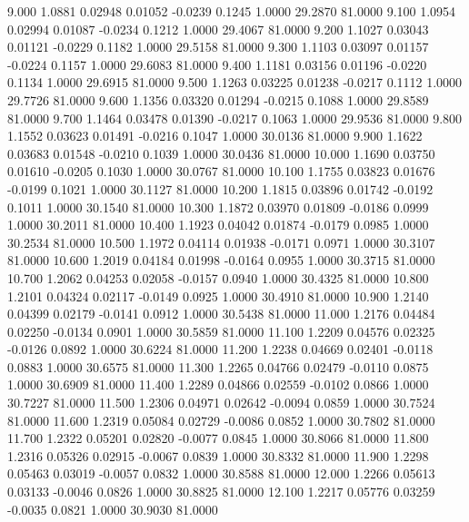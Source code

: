    9.000   1.0881   0.02948   0.01052  -0.0239   0.1245   1.0000  29.2870  81.0000
   9.100   1.0954   0.02994   0.01087  -0.0234   0.1212   1.0000  29.4067  81.0000
   9.200   1.1027   0.03043   0.01121  -0.0229   0.1182   1.0000  29.5158  81.0000
   9.300   1.1103   0.03097   0.01157  -0.0224   0.1157   1.0000  29.6083  81.0000
   9.400   1.1181   0.03156   0.01196  -0.0220   0.1134   1.0000  29.6915  81.0000
   9.500   1.1263   0.03225   0.01238  -0.0217   0.1112   1.0000  29.7726  81.0000
   9.600   1.1356   0.03320   0.01294  -0.0215   0.1088   1.0000  29.8589  81.0000
   9.700   1.1464   0.03478   0.01390  -0.0217   0.1063   1.0000  29.9536  81.0000
   9.800   1.1552   0.03623   0.01491  -0.0216   0.1047   1.0000  30.0136  81.0000
   9.900   1.1622   0.03683   0.01548  -0.0210   0.1039   1.0000  30.0436  81.0000
  10.000   1.1690   0.03750   0.01610  -0.0205   0.1030   1.0000  30.0767  81.0000
  10.100   1.1755   0.03823   0.01676  -0.0199   0.1021   1.0000  30.1127  81.0000
  10.200   1.1815   0.03896   0.01742  -0.0192   0.1011   1.0000  30.1540  81.0000
  10.300   1.1872   0.03970   0.01809  -0.0186   0.0999   1.0000  30.2011  81.0000
  10.400   1.1923   0.04042   0.01874  -0.0179   0.0985   1.0000  30.2534  81.0000
  10.500   1.1972   0.04114   0.01938  -0.0171   0.0971   1.0000  30.3107  81.0000
  10.600   1.2019   0.04184   0.01998  -0.0164   0.0955   1.0000  30.3715  81.0000
  10.700   1.2062   0.04253   0.02058  -0.0157   0.0940   1.0000  30.4325  81.0000
  10.800   1.2101   0.04324   0.02117  -0.0149   0.0925   1.0000  30.4910  81.0000
  10.900   1.2140   0.04399   0.02179  -0.0141   0.0912   1.0000  30.5438  81.0000
  11.000   1.2176   0.04484   0.02250  -0.0134   0.0901   1.0000  30.5859  81.0000
  11.100   1.2209   0.04576   0.02325  -0.0126   0.0892   1.0000  30.6224  81.0000
  11.200   1.2238   0.04669   0.02401  -0.0118   0.0883   1.0000  30.6575  81.0000
  11.300   1.2265   0.04766   0.02479  -0.0110   0.0875   1.0000  30.6909  81.0000
  11.400   1.2289   0.04866   0.02559  -0.0102   0.0866   1.0000  30.7227  81.0000
  11.500   1.2306   0.04971   0.02642  -0.0094   0.0859   1.0000  30.7524  81.0000
  11.600   1.2319   0.05084   0.02729  -0.0086   0.0852   1.0000  30.7802  81.0000
  11.700   1.2322   0.05201   0.02820  -0.0077   0.0845   1.0000  30.8066  81.0000
  11.800   1.2316   0.05326   0.02915  -0.0067   0.0839   1.0000  30.8332  81.0000
  11.900   1.2298   0.05463   0.03019  -0.0057   0.0832   1.0000  30.8588  81.0000
  12.000   1.2266   0.05613   0.03133  -0.0046   0.0826   1.0000  30.8825  81.0000
  12.100   1.2217   0.05776   0.03259  -0.0035   0.0821   1.0000  30.9030  81.0000
